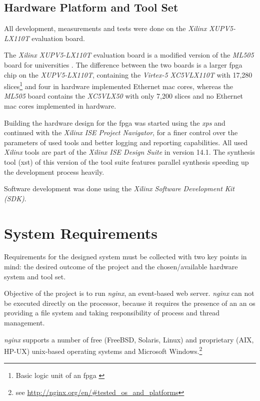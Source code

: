 \section{Hardware Platform and Tool Set}

All development, measurements and tests were done on the \textit{Xilinx XUPV5-LX110T} evaluation board.

The \textit{Xilinx XUPV5-LX110T} evaluation board is a modified version of the \textit{ML505} board for universities \cite{xupv5manual}. The difference between the two boards is a larger \gls{fpga} chip on the \textit{XUPV5-LX110T}, containing the \textit{Virtex-5 XC5VLX110T} with 17,280 slices\footnote{Basic logic unit of an \gls{fpga} \cite{fpga_ni}} and four in hardware implemented Ethernet \gls{mac} cores, whereas the \textit{ML505} board contains the \textit{XC5VLX50} with only 7,200 slices and no Ethernet \gls{mac} cores implemented in hardware.

Building the hardware design for the \gls{fpga} was started using the \textit{\gls{xps}} and continued with the \textit{Xilinx ISE Project Navigator}, for a finer control over the parameters of used tools and better logging and reporting capabilities. All used \textit{Xilinx} tools are part of the \textit{Xilinx ISE Design Suite} in version 14.1. The synthesis tool (xst) of this version of the tool suite features parallel synthesis speeding up the development process heavily.

Software development was done using the \textit{Xilinx Software Development Kit (SDK)}.

\chapter{System Requirements}

Requirements for the designed system must be collected with two key points in mind: the desired outcome of the project and the chosen/available hardware system and tool set.

Objective of the project is to run \textit{nginx}, an event-based web server. \textit{nginx} can not be executed directly on the processor, because it requires the presence of an an \gls{os} providing a file system and taking responsibility of process and thread management. 

\textit{nginx} supports a number of free (FreeBSD, Solaris, Linux) and proprietary (AIX, HP-UX) unix-based operating systems and Microsoft Windows.\footnote{see \url{http://nginx.org/en/\#tested_os_and_platforms}}

